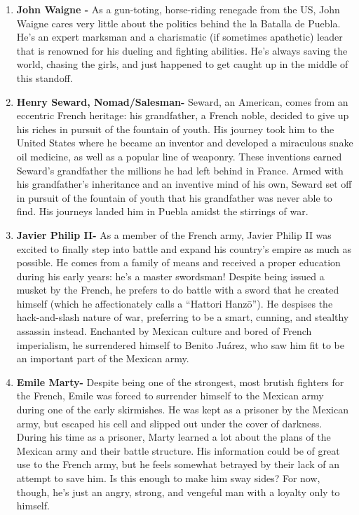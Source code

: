 \documentclass[10pt, letterpaper]{article}
\begin{document}
\begin{enumerate}
\item
  
  \textbf{John Waigne -} As a gun-toting, horse-riding renegade from the
  US, John Waigne cares very little about the politics behind the la
  Batalla de Puebla. He's an expert marksman and a charismatic (if
  sometimes apathetic) leader that is renowned for his dueling and
  fighting abilities. He's always saving the world, chasing the girls,
  and just happened to get caught up in the middle of this standoff.
  
\item
  
  \textbf{Henry Seward, Nomad/Salesman-} Seward, an American, comes from
  an eccentric French heritage: his grandfather, a French noble, decided
  to give up his riches in pursuit of the fountain of youth. His journey
  took him to the United States where he became an inventor and
  developed a miraculous snake oil medicine, as well as a popular line
  of weaponry. These inventions earned Seward's grandfather the millions
  he had left behind in France. Armed with his grandfather's inheritance
  and an inventive mind of his own, Seward set off in pursuit of the
  fountain of youth that his grandfather was never able to find. His
  journeys landed him in Puebla amidst the stirrings of war.
  
\item
  
  \textbf{Javier Philip II-} As a member of the French army, Javier
  Philip II was excited to finally step into battle and expand his
  country's empire as much as possible. He comes from a family of means
  and received a proper education during his early years: he's a master
  swordsman! Despite being issued a musket by the French, he prefers to
  do battle with a sword that he created himself (which he
  affectionately calls a ``Hattori Hanzō''). He despises the
  hack-and-slash nature of war, preferring to be a smart, cunning, and
  stealthy assassin instead. Enchanted by Mexican culture and bored of
  French imperialism, he surrendered himself to Benito Juárez, who saw
  him fit to be an important part of the Mexican army.
  
\item
  
  \textbf{Emile Marty-} Despite being one of the strongest, most brutish
  fighters for the French, Emile was forced to surrender himself to the
  Mexican army during one of the early skirmishes. He was kept as a
  prisoner by the Mexican army, but escaped his cell and slipped out
  under the cover of darkness. During his time as a prisoner, Marty
  learned a lot about the plans of the Mexican army and their battle
  structure. His information could be of great use to the French army,
  but he feels somewhat betrayed by their lack of an attempt to save
  him. Is this enough to make him sway sides? For now, though, he's just
  an angry, strong, and vengeful man with a loyalty only to himself.
  

\end{enumerate}
\end{document}

